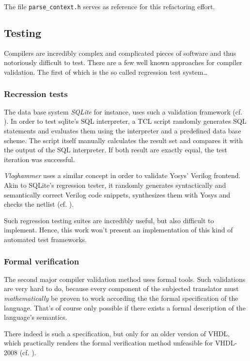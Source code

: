 The file \texttt{parse_context.h} serves as reference for this
refactoring effort.

\subsection{Testing}
\label{sec:autoTests}
Compilers are incredibly complex and complicated pieces of
software and thus notoriously difficult to test. There are a few
well known approaches for compiler validation. The first of which
is the so called regression test system\ldots

\subsubsection{Recression tests}
\label{sec:autoTestsReg}
The data base system \emph{SQLite}
for instance, uses such a validation framework (cf. \cite{SQLITE}).
In order to test sqlite's SQL interpreter, a TCL script
randomly generates SQL statements and evaluates them using the
interpreter and a predefined data base scheme. The script itself
manually calculates the result set and compares it with the output of
the SQL interpreter. If both result are exactly equal, the test
iteration was successful.

\emph{Vloghammer} uses a similar concept in order to validate Yosys'
Verilog
frontend. Akin to SQLite's regression tester, it randomly generates
syntactically and semantically correct Verilog code snippets,
synthesizes them with Yosys and checks the netlist
(cf. \cite{VLOGHAMMER}).

Such regression testing suites are incredibly useful, but also
difficult to implement. Hence, this work won't present an
implementation of this kind of automated test frameworks.

\subsubsection{Formal verification}
The second major compiler validation method uses formal tools. Such
validations are very hard to do, because every component of the
subjected translator must \emph{mathematically} be proven to work
according the the formal specification of the language. That's of
course only possible if there exists a formal description of the
language's semantics.

There indeed is such a specification, but only for an older version of
VHDL, which practically renders the formal verification method
unfeasible for VHDL-2008 (cf. \cite{VHDLFORM}).

